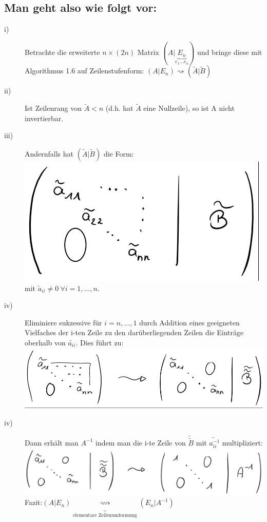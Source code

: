 \documentclass{scrbook}
\begin{document}
\subsection*{Man geht also wie folgt vor:}
\begin{description}
\item[i)] Betrachte die erweiterte $n\times (2n)$ Matrix $(A|\underbrace{ E_n}_{e_1...e_n})$ und bringe diese mit Algorithmus 1.6 auf Zeilenstufenform: $(A|E_n) \rightsquigarrow (\tilde{A}|\tilde{B})$
\item[ii)] Ist Zeilenrang von $\tilde{A} <n$ (d.h. hat $\tilde{A}$ eine Nullzeile), so ist A nicht invertierbar.
\item[iii)] Andernfalls hat $(\tilde{A}|\tilde{B})$ die Form: \\\includegraphics{Matrix_1} mit $\tilde{a}_{ii} \neq 0 \ \forall i = 1,...,n$.
\item[iv)] Eliminiere sukzessive für $i=n,...,1$ durch Addition eines geeigneten Vielfaches der i-ten Zeile zu den darüberliegenden Zeilen die Einträge oberhalb von $\tilde{a_{ii}}$. Dies führt zu:\\\includegraphics{Matrix_2} 
\item[iv)] Dann erhält man $A^{-1}$ indem man die i-te Zeile von $\tilde{ \tilde{B}}$ mit $\tilde{a_{ii}^{-1}}$ multipliziert:\\
\includegraphics{Matrix_3}\\
Fazit:$(A|E_n)\underbrace{\rightsquigarrow}_{\text{elementare Zeilenumformung}}(E_n|A^{-1})$
\end{description}
\end{document}
